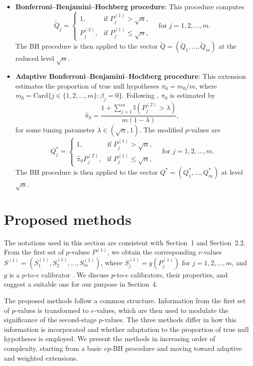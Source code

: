 \documentclass[11pt]{article}
\numberwithin{equation}{section}
\theoremstyle{plain}
\theoremstyle{remark}
\begin{document}
\begin{itemize}
    \item \textbf{Bonferroni–Benjamini–Hochberg procedure}: This procedure computes
    \[
    \tilde{Q}_j = \begin{cases}
    1, & \text{if } P^{(1)}_j > \sqrt{\alpha}, \\
    P^{(2)}_j, & \text{if } P^{(1)}_j \leq \sqrt{\alpha},
    \end{cases}
    \quad \text{for } j = 1, 2, \dots, m.
    \]
    The BH procedure is then applied to the vector \(\tilde{Q} = (\tilde{Q}_1, \dots, \tilde{Q}_m)\) at the reduced level \(\sqrt{\alpha}\).

    \item \textbf{Adaptive Bonferroni–Benjamini–Hochberg procedure}: This extension estimates the proportion of true null hypotheses \(\pi_0 = m_0 / m\), where \(m_0 = \text{Card}\{j \in \{1, 2, \ldots, m\} : \beta_j = 0\}\). Following \citet{storey2004strong}, \(\pi_0\) is estimated by
    \[
    \hat{\pi}_0 = \frac{1 + \sum_{j=1}^m \mathbb{I}(P_j^{(2)} > \lambda)}{m(1 - \lambda)},
    \]
    for some tuning parameter \(\lambda \in (\sqrt{\alpha}, 1)\). The modified $p$-values are
    \[
    Q^*_j = \begin{cases}
    1, & \text{if } P^{(1)}_j > \sqrt{\alpha}, \\
    \hat{\pi}_0 P^{(2)}_j, & \text{if } P^{(1)}_j \leq \sqrt{\alpha},
    \end{cases}
    \quad \text{for } j = 1, 2, \dots, m.
    \]
    The BH procedure is then applied to the vector \(Q^* = (Q^*_1, \dots, Q^*_m)\) at level \(\sqrt{\alpha}\).
\end{itemize}
 
\section{Proposed methods}

The notations used in this section are consistent with Section~1 and Section~2.2.
From the first set of $p$-values $P^{(1)}$, we obtain the corresponding $e$-values $S^{(1)} = (S^{(1)}_1, S^{(1)}_2, \ldots, S^{(1)}_m)$, where $S^{(1)}_j = g(P^{(1)}_j)$ for $j = 1, 2, \ldots, m$, and $g$ is a $p$-to-$e$ calibrator \citep{vovk2021evalues}.
We discuss $p$-to-$e$ calibrators, their properties, and suggest a suitable one for our purpose in Section~4.

The proposed methods follow a common structure. Information from the first set of $p$-values is transformed to $e$-values, which are then used to modulate the significance of the second-stage $p$-values. The three methods differ in how this information is incorporated and whether adaptation to the proportion of true null hypotheses is employed. We present the methods in increasing order of complexity, starting from a basic $ep$-BH procedure and moving toward adaptive and weighted extensions.
\end{document}
